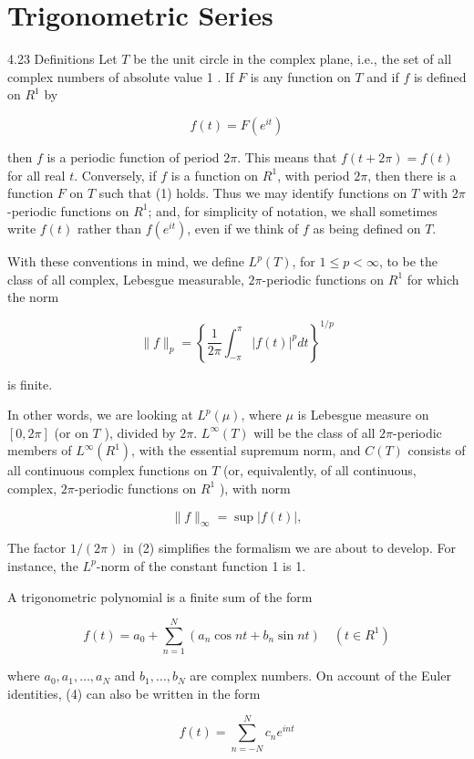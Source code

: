 \documentclass[10pt]{article}
\begin{document}
\section{Trigonometric Series}
4.23 Definitions Let $T$ be the unit circle in the complex plane, i.e., the set of all complex numbers of absolute value 1 . If $F$ is any function on $T$ and if $f$ is defined on $R^{1}$ by

$$
f(t)=F\left(e^{i t}\right)
$$

then $f$ is a periodic function of period $2 \pi$. This means that $f(t+2 \pi)=f(t)$ for all real $t$. Conversely, if $f$ is a function on $R^{1}$, with period $2 \pi$, then there is a function $F$ on $T$ such that (1) holds. Thus we may identify functions on $T$ with $2 \pi$-periodic functions on $R^{1}$; and, for simplicity of notation, we shall sometimes write $f(t)$ rather than $f\left(e^{i t}\right)$, even if we think of $f$ as being defined on $T$.

With these conventions in mind, we define $L^{p}(T)$, for $1 \leq p<\infty$, to be the class of all complex, Lebesgue measurable, $2 \pi$-periodic functions on $R^{1}$ for which the norm

$$
\|f\|_{p}=\left\{\frac{1}{2 \pi} \int_{-\pi}^{\pi}|f(t)|^{p} d t\right\}^{1 / p}
$$

is finite.

In other words, we are looking at $L^{p}(\mu)$, where $\mu$ is Lebesgue measure on $[0,2 \pi]$ (or on $T$ ), divided by $2 \pi$. $L^{\infty}(T)$ will be the class of all $2 \pi$-periodic members of $L^{\infty}\left(R^{1}\right)$, with the essential supremum norm, and $C(T)$ consists of all continuous complex functions on $T$ (or, equivalently, of all continuous, complex, $2 \pi$-periodic functions on $R^{1}$ ), with norm

$$
\|f\|_{\infty}=\sup |f(t)|,
$$

The factor $1 /(2 \pi)$ in (2) simplifies the formalism we are about to develop. For instance, the $L^{p}$-norm of the constant function 1 is 1.

A trigonometric polynomial is a finite sum of the form

$$
f(t)=a_{0}+\sum_{n=1}^{N}\left(a_{n} \cos n t+b_{n} \sin n t\right) \quad\left(t \in R^{1}\right)
$$

where $a_{0}, a_{1}, \ldots, a_{N}$ and $b_{1}, \ldots, b_{N}$ are complex numbers. On account of the Euler identities, (4) can also be written in the form

$$
f(t)=\sum_{n=-N}^{N} c_{n} e^{i n t}
$$
\end{document}
